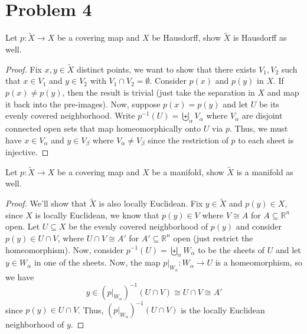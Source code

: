 \documentclass[11pt]{article} %
\newcommand{\R}{\mathbb{R}}
\begin{document}
 \section*{Problem 4}
 Let $p:\tilde{X}\to X$ be a covering map and $X$ be Hausdorff, show $\tilde{X}$ is Hausdorff as well.

 \begin{proof}
 Fix $x,y\in \tilde{X}$ distinct points, we want to show that there exists $V_1,V_2$ such that $x\in V_1$ and $y\in V_2$ with $V_1\cap V_2 = \emptyset$. Consider $p(x)$ and $p(y)$ in $X$. If $p(x)\ne p(y)$, then the result is trivial (just take the separation in $X$ and map it back into the pre-images). Now, suppose $p(x)=p(y)$ and let $U$ be its evenly covered neighborhood. Write $p^{-1}(U) = \biguplus_\alpha V_\alpha$ where $V_\alpha$ are disjoint connected open sets that map homeomorphically onto $U$ via $p$. Thus, we must have $x\in V_\alpha$ and $y\in V_\beta$ where $V_\alpha\ne V_\beta$ since the restriction of $p$ to each sheet is injective. 
 \end{proof}

 Let $p:\tilde{X}\to X$ be a covering map and $X$ be a manifold, show $\tilde{X}$ is a manifold as well.

 \begin{proof}
 We'll show that $\tilde{X}$ is also locally Euclidean. Fix $y\in \tilde{X}$ and $p(y)\in X$, since $X$ is locally Euclidean, we know that $p(y)\in V$ where $V\cong A$ for $A\subseteq \R^n$ open. Let $U\subseteq X$ be the evenly covered neighborhood of $p(y)$ and consider $p(y)\in U\cap V$, where $U\cap V\cong A'$ for $A'\subseteq \R^n$ open (just restrict the homeomorphism). Now, consider $p^{-1}(U) = \biguplus_\alpha W_\alpha$ to be the sheets of $U$ and let $y\in W_\alpha$ in one of the sheets. Now, the map $p\big|_{W_\alpha}:W_\alpha\to U$ is a homeomorphism, so we have
 \[y\in \left(p\big|_{W_\alpha}\right)^{-1}(U\cap V) \cong U\cap V \cong A'\]
 since $p(y)\in U\cap V$. Thus, $\left(p\big|_{W_\alpha}\right)^{-1}(U\cap V)$ is the locally Euclidean neighborhood of $y$.
 \end{proof}
\end{document}
